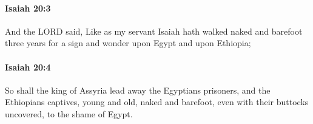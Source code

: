 		\paragraph{Isaiah 20:3} %
			\label{ISAIAH-20-3}

			And the LORD said, Like as my servant Isaiah hath walked naked and barefoot three years for a sign and wonder upon Egypt and upon Ethiopia;


		\paragraph{Isaiah 20:4} %
			\label{ISAIAH-20-4}

			So shall the king of Assyria lead away the Egyptians prisoners, and the Ethiopians captives, young and old, naked and barefoot, even with their buttocks uncovered, to the shame of Egypt.


